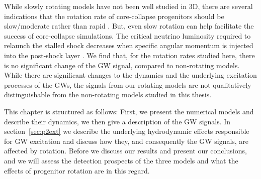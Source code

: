 While slowly rotating models have not been well studied in 3D, there are several
indications that the rotation rate of core-collapse progenitors should be slow/moderate 
rather than rapid \citep{heger_05,beck_12,mosser_12,popov_12,noutsos_13,cantiello_14,deheuvels_14}. 
But, even slow rotation can help facilitate the success of core-collapse
simulations. The critical neutrino luminosity required to relaunch the stalled shock decreases when specific angular momentum is injected into the post-shock layer \citep{iwakami_14,nakamura_14}.
We find that, for the rotation rates studied here, there is no significant change of
the GW signal, compared to non-rotating models. While there are significant changes to the dynamics
and the underlying excitation processes of the GWs, the signals from our rotating models are not qualitatively
distinguishable from the non-rotating models studied in this thesis. 

This chapter is structured as follows: First, we present the numerical models and describe their dynamics,
we then give a description of the GW signals. In section~\ref{sec:p2ext} we describe the underlying hydrodynamic
effects responsible for GW excitation and discuss how they, and consequently the GW signals, are affected by rotation. 
Before we discuss our results and present our conclusions, and we will assess the detection prospects of the three
models and what the effects of progenitor rotation are in this regard.  


